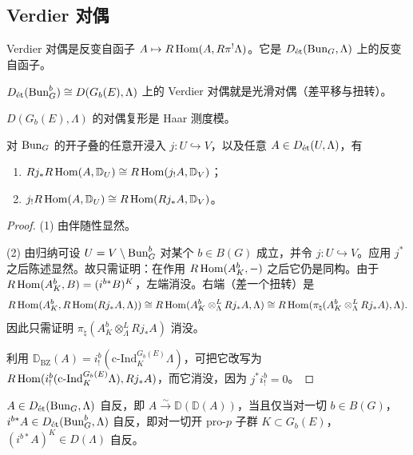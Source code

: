 
\subsection{Verdier 对偶}

Verdier 对偶是反变自函子 $A\mapsto R\Hom(A,R\pi^!\Lambda)$。它是 $D_{\et}(\Bun_G,\Lambda)$ 上的反变自函子。

$D_{\et}(\Bun^b_G)\cong D(G_b(E),\Lambda)$ 上的 Verdier 对偶就是光滑对偶（差平移与扭转）。

\begin{example}
$D(G_b(E),\Lambda)$ 的对偶复形是 Haar 测度模。
\end{example}

\begin{theorem}
对 $\Bun_G$ 的开子叠的任意开浸入 $j\colon U\hookrightarrow V$，以及任意 $A\in D_{\et}(U,\Lambda)$，有
\begin{enumerate}[label=(\arabic*)]
\item $Rj_*R\Hom(A,\mathbb{D}_U)\cong R\Hom(j_!A,\mathbb{D}_V)$；
\item $j_!R\Hom(A,\mathbb{D}_U)\cong R\Hom(Rj_*A,\mathbb{D}_V)$。
\end{enumerate}
\end{theorem}

\begin{proof}
(1) 由伴随性显然。

(2) 由归纳可设 $U=V\setminus\Bun^b_G$ 对某个 $b\in B(G)$ 成立，并令 $j\colon U\hookrightarrow V$。应用 $j^*$ 之后陈述显然。故只需证明：在作用 $R\Hom(A^b_K,-)$ 之后它仍是同构。由于 $R\Hom(A^b_K,B)=(i^{b*}B)^K$，左端消没。右端（差一个扭转）是
\[
R\Hom(A^b_K,R\Hom(Rj_*A,\Lambda))\cong R\Hom(A^b_K\otimes^L_\Lambda Rj_*A,\Lambda)\cong R\Hom(\pi_\natural(A^b_K\otimes^L_\Lambda Rj_*A),\Lambda).
\]
因此只需证明 $\pi_\natural(A^b_K\otimes^L_\Lambda Rj_*A)$ 消没。

利用 $\mathbb{D}_{\mathrm{BZ}}(A)=i^b_!(\mathrm{c}\text{-}\mathrm{Ind}^{G_b(E)}_K\Lambda)$，可把它改写为 $R\Hom(i^b_!(\mathrm{c}\text{-}\mathrm{Ind}^{G_b(E)}_K\Lambda),Rj_*A)$，而它消没，因为 $j^*i^b_!=0$。
\end{proof}

\begin{corollary}
$A\in D_{\et}(\Bun_G,\Lambda)$ 自反，即 $A\xrightarrow{\sim}\mathbb{D}(\mathbb{D}(A))$，当且仅当对一切 $b\in B(G)$，$i^{b*}A\in D_{\et}(\Bun^b_G,\Lambda)$ 自反，即对一切开 pro-$p$ 子群 $K\subset G_b(E)$，$(i^{b*}A)^K\in D(\Lambda)$ 自反。
\end{corollary}

